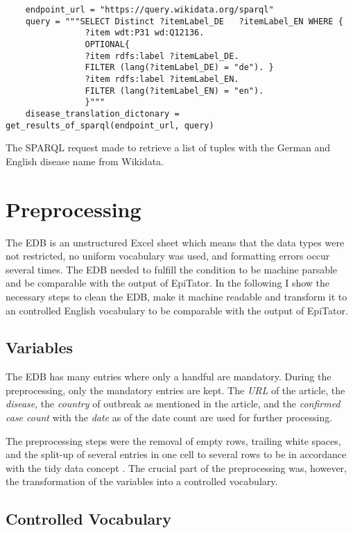 \begin{listing}[h]
  \begin{verbatim}
    endpoint_url = "https://query.wikidata.org/sparql"
    query = """SELECT Distinct ?itemLabel_DE   ?itemLabel_EN WHERE {
                ?item wdt:P31 wd:Q12136.
                OPTIONAL{
                ?item rdfs:label ?itemLabel_DE.
                FILTER (lang(?itemLabel_DE) = "de"). }
                ?item rdfs:label ?itemLabel_EN.
                FILTER (lang(?itemLabel_EN) = "en").
                }"""
    disease_translation_dictonary = get_results_of_sparql(endpoint_url, query)
  \end{verbatim}
  \caption{The SPARQL request made to retrieve a list of tuples with the German and English disease name from Wikidata.}
  \label{lst:wikidata}
\end{listing}


\section{Preprocessing}
The EDB is an unstructured Excel sheet which means that the data types were not restricted, no uniform vocabulary was used, and formatting errors occur several times.
The EDB needed to fulfill the condition to be machine parsable and be comparable with the output of EpiTator.
In the following I show the necessary steps to clean the EDB, make it machine readable and transform it to an controlled English vocabulary to be comparable with the output of EpiTator.

\subsection{Variables}
The EDB has many entries where only a handful are mandatory. During the preprocessing, only the mandatory entries are kept.
The \emph{URL} of the article, the \emph{disease}, the \emph{country} of outbreak as mentioned in the article, and the \emph{confirmed case count} with the \emph{date} as of the date count are used for further processing.

The preprocessing steps were the removal of empty rows, trailing white spaces, and the split-up of several entries in one cell to several rows to be in accordance with the tidy data concept \citep{Wickham2014}.
The crucial part of the preprocessing was, however, the transformation of the variables into a controlled vocabulary.

\subsection{Controlled Vocabulary}
